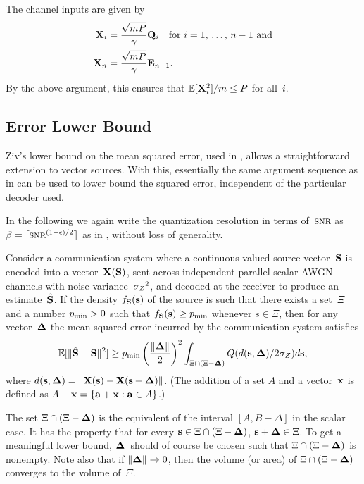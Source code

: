 The channel inputs are given by
\begin{align*}
  \X_i &= \frac{\sqrt{mP}}{\gamma} \Q_i \quad \text{for $i = 1$, \dots, $n-1$
  and} \\
  \X_n &= \frac{\sqrt{mP}}{\gamma} \Evc_{n-1}.
\end{align*}
By the above argument, this ensures that $\E[\X_i^2]/m \le P$ for all~$i$.



\subsection{Error Lower Bound}

Ziv's lower bound on the mean squared error, used in ,
allows a straightforward extension to vector sources. With this, essentially the
same argument sequence as in  can be used to lower bound the
squared error, independent of the particular decoder used.

In the following we again write the quantization resolution in terms of~$\snr$
as $\beta = \lceil \snr^{(1-\e)/2} \rceil$ as in , without
loss of generality.

\begin{lemma}
  \label{lem:zivboundvec}
  Consider a communication system where a continuous-valued source vector~$\S$
  is encoded into a vector~$\X(\S)$, sent across independent parallel scalar
  AWGN channels with noise variance~$\szq$, and decoded at the receiver to
  produce an estimate~$\Shv$. If the density $f_{\S}(\s)$ of the source is such
  that there exists a set~$\Xi$ and a number $\pmin > 0$ such that $f_{\S}(\s)
  \ge \pmin$ whenever $s \in \Xi$, then for any vector~$\Dv$ the mean squared
  error incurred by the communication system satisfies
  \begin{equation*}
    \msev \ge \pmin  \left( \frac{\|\Dv\|}{2}\right)^2 \int_{\Xi \cap (\Xi -
    \Dv)} Q(d(\s, \Dv)/2 \sz) d\s,
  \end{equation*}
  where $d(\s,\Dv) = \|\X(\s) - \X(\s + \Dv)\|$. (The addition of a set $A$ and
  a vector~$\x$ is defined as $A + \x = \{\vect{a} + \x : \vect{a} \in A\}$.)
\end{lemma}

\begin{remark}
  \label{rem:zivboundvec}
  The set $\Xi \cap (\Xi - \Dv)$ is the equivalent of the interval $[A,
  B-\Delta]$ in the scalar case. It has the property that for every $\s \in \Xi
  \cap (\Xi - \Dv)$, $\s + \Dv \in \Xi$. To get a meaningful lower bound,
  $\Dv$~should of course be chosen such that $\Xi \cap (\Xi - \Dv)$ is nonempty.
  Note also that if $\|\Dv\| \goesto 0$, then the volume (or area) of $\Xi \cap
  (\Xi - \Dv)$ converges to the volume of~$\Xi$.
\end{remark}

